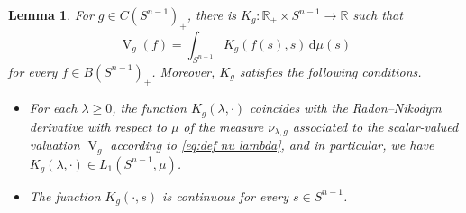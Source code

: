 \documentclass[11pt, a4paper]{amsart}
\newtheorem{lemma}[proposition]{Lemma}
\renewcommand{\d}{\,\mathrm{d}}
\newcommand{\rp}{\mathbb R_{\scriptscriptstyle +}}
\newcommand{\sn}{{S^{n-1}}}
\renewcommand{\d}{\,\mathrm{d}}
\newcommand{\oV}{\operatorname{V}}
\newcommand{\cfn}{C(\sn )_{\scriptscriptstyle +}}
\newcommand{\bfn}{B(\sn )_{\scriptscriptstyle +}}
\newcommand{\R}{\mathbb R}
\begin{document}
\begin{lemma}
For $g\in\cfn$, there is $K_g\colon \rp\times \sn \to \R$ such that
$$\oV_g(f)= \int_{\sn } K_g(f(s), s) \d\mu(s)$$
for every $f\in \bfn$. Moreover, $K_g$ satisfies the following conditions.
\begin{itemize}
    \item For each $\lambda\ge 0$, the function $K_g(\lambda,\cdot)$ coincides with the Radon--Nikodym derivative with respect to $\mu$ of the measure $\nu_{\lambda,g}$ associated to the scalar-valued valuation $\oV_g$ according to \eqref{eq:def nu lambda}, and in particular, we have $K_g(\lambda, \cdot)\in L_1(\sn,\mu)$.
    \item The function $K_g(\cdot,s)$ is continuous for every $s\in \sn $.
\end{itemize}
\end{lemma}
\end{document}
